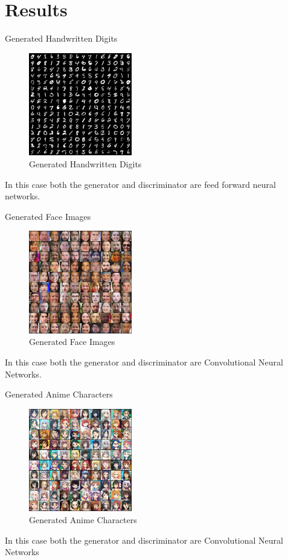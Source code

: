 \section*{Results}
\begin{frame}{Generated Handwritten Digits}
    \begin{figure}
        \centering
        \includegraphics[width=0.4\textwidth]{../Images/gan5.png}
        \caption{Generated Handwritten Digits}
    \end{figure}
    In this case both the generator and discriminator are feed forward neural networks.
\end{frame}

\begin{frame}{Generated Face Images}
    \begin{figure}
        \centering
        \includegraphics[width=0.4\textwidth]{../Images/gan6.png}
        \caption{Generated Face Images}
    \end{figure}
    In this case both the generator and discriminator are Convolutional Neural Networks.
\end{frame}

\begin{frame}{Generated Anime Characters}
    \begin{figure}
        \centering
        \includegraphics[width=0.4\textwidth]{../Images/gan7.png}
        \caption{Generated Anime Characters}
    \end{figure}
    In this case both the generator and discriminator are Convolutional Neural Networks
\end{frame}

